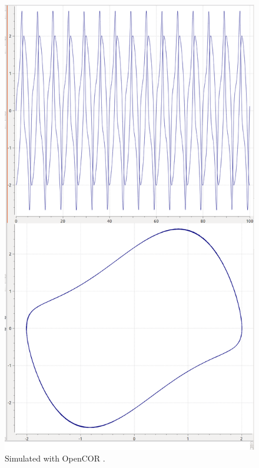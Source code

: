 \begin{figure}[ht]
\begin{minipage}{0.47\textwidth}
        \includegraphics[width=1.0\textwidth]{examples/vanderpol-cellml/results/opencor/plot1-2}
        \caption{Simulated with OpenCOR \citep{garny2015opencor}.}
    \end{minipage}
    \label{fig:lorenz-cellml}
\end{figure}


